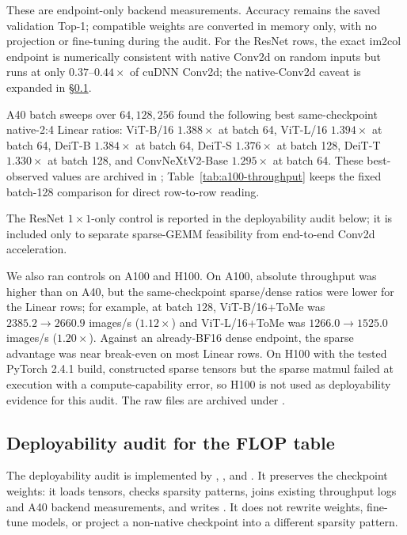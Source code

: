 \documentclass[11pt]{article}
\theoremstyle{plain}
\theoremstyle{definition}
\theoremstyle{remark}
\newcommand{\1}{\mathbf{1}}
\begin{document}
These are endpoint-only backend measurements. Accuracy remains the saved validation Top-1; compatible weights are converted in memory only, with no projection or fine-tuning during the audit. For the ResNet rows, the exact im2col endpoint is numerically consistent with native Conv2d on random inputs but runs at only \(0.37\)--\(0.44\times\) of cuDNN Conv2d; the native-Conv2d caveat is expanded in \S\ref{subsec:6to24}.

A40 batch sweeps over \(64,128,256\) found the following best same-checkpoint native-2:4 Linear ratios: ViT-B/16 \(1.388\times\) at batch 64, ViT-L/16 \(1.394\times\) at batch 64, DeiT-B \(1.384\times\) at batch 64, DeiT-S \(1.376\times\) at batch 128, DeiT-T \(1.330\times\) at batch 128, and ConvNeXtV2-Base \(1.295\times\) at batch 64. These best-observed values are archived in ; Table~\ref{tab:a100-throughput} keeps the fixed batch-128 comparison for direct row-to-row reading.

The ResNet \(1\times1\)-only control is reported in the deployability audit below; it is included only to separate sparse-GEMM feasibility from end-to-end Conv2d acceleration.

We also ran controls on A100 and H100. On A100, absolute throughput was higher than on A40, but the same-checkpoint sparse/dense ratios were lower for the Linear rows; for example, at batch \(128\), ViT-B/16+ToMe was \(2385.2\rightarrow2660.9\) images/s (\(1.12\times\)) and ViT-L/16+ToMe was \(1266.0\rightarrow1525.0\) images/s (\(1.20\times\)). Against an already-BF16 dense endpoint, the sparse advantage was near break-even on most Linear rows. On H100 with the tested PyTorch 2.4.1 build,  constructed sparse tensors but the sparse matmul failed at execution with a compute-capability error, so H100 is not used as deployability evidence for this audit. The raw files are archived under .

\subsection{Deployability audit for the FLOP table}
\label{subsec:6to24}

The deployability audit is implemented by , , and . It preserves the checkpoint weights: it loads tensors, checks sparsity patterns, joins existing throughput logs and A40 backend measurements, and writes . It does not rewrite weights, fine-tune models, or project a non-native checkpoint into a different sparsity pattern.
\end{document}
